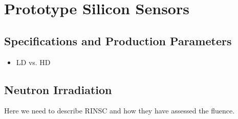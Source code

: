 \section{Prototype Silicon Sensors}
\label{sec:sensors}

\subsection{Specifications and Production Parameters}
\label{subsec:sensors_specifications}

\begin{itemize}
    \item LD vs. HD
\end{itemize}

\subsection{Neutron Irradiation}
\label{subsec:sensors_irradiation}
Here we need to describe RINSC and how they have assessed the fluence.